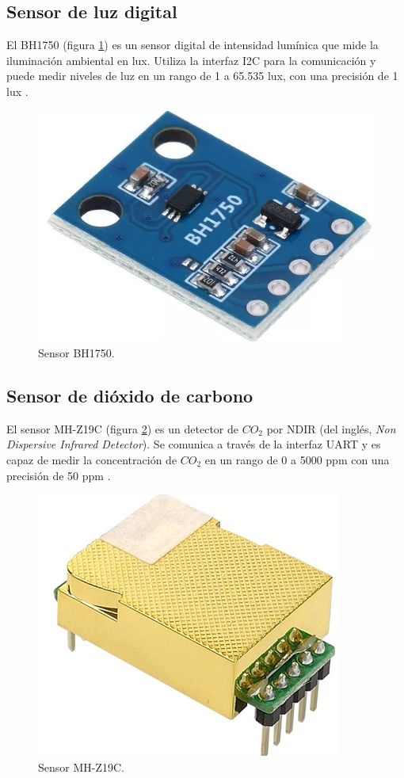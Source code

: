 
\subsection{Sensor de luz digital}\label{sec:BH1750}

El BH1750 (figura \ref{fig:BH1750}) es un sensor digital de intensidad lumínica
que mide la iluminación ambiental en lux. Utiliza la interfaz I2C para la
comunicación y puede medir niveles de luz en un rango de 1 a 65.535 lux, con
una precisión de 1 lux \cite{ROHM_BH1750}.

\begin{figure}[H]
	\centering
	\includegraphics[height=.15\textwidth]{./Images/5.png}
	\caption{Sensor BH1750\protect\footnotemark.}
	\label{fig:BH1750}
\end{figure}


\subsection{Sensor de dióxido de carbono}

El sensor MH-Z19C (figura \ref{fig:MHZ19C}) es un detector de $CO_2$ por NDIR
(del inglés, \textit{Non Dispersive Infrared Detector}). Se comunica a través
de la interfaz UART y es capaz de medir la concentración de $CO_2$ en un rango
de 0 a 5000 ppm con una precisión de 50 ppm \cite{WINSEN_MHZ19C}.

\begin{figure}[H]
	\centering
	\includegraphics[height=.15\textwidth]{./Images/6.png}
	\caption{Sensor MH-Z19C\protect\footnotemark.}
	\label{fig:MHZ19C}
\end{figure}

